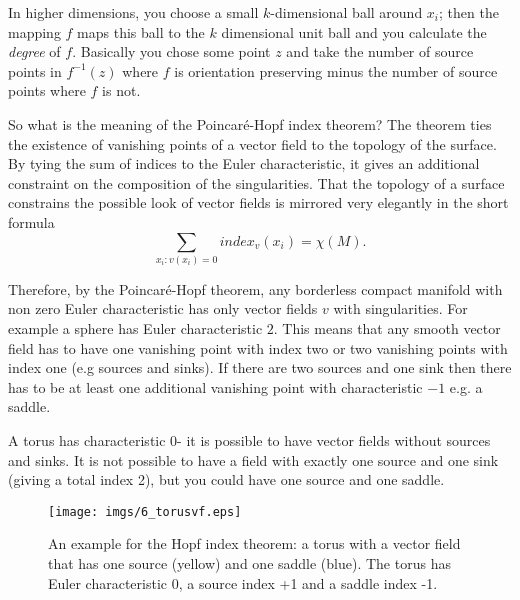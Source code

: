  In higher dimensions, you choose a small $k$-dimensional ball around $x_i$; then the mapping $f$ maps this ball to the $k$ dimensional unit ball and you calculate the \emph{degree} of $f$. Basically you chose some point $z$ and take the number of source points in $f^{-1}(z)$ where $f$ is orientation preserving minus the number of source points where $f$ is not. %


So what is the meaning of the Poincar\'e-Hopf index theorem? 
The theorem ties the existence of vanishing points of a vector field to the topology of the surface. By tying the sum of indices to the Euler characteristic, it gives an additional constraint on the composition of the singularities. That the topology of a surface constrains the possible look of vector fields is mirrored very elegantly in the short formula
\[\sum_{x_i: v(x_i) = 0} index_v(x_i) = \chi(M).\]

Therefore, by the Poincar\'e-Hopf theorem, any borderless compact manifold with non zero Euler characteristic has only vector fields $v$ with singularities. For example a sphere has Euler characteristic $2$. This means that any smooth vector field has to have one vanishing point with index two or two vanishing points with index one (e.g sources and sinks). If there are two sources and one sink then there has to be at least one additional vanishing point with characteristic $-1$ e.g. a saddle. 

A torus has characteristic $0$- it is possible to have vector fields without sources and sinks. It is not possible to have a field with exactly one source and one sink (giving a total index 2), but you could have one source and one saddle. 

\begin{figure}%
\texttt{[image: imgs/6\_torusvf.eps]}%
\caption{An example for the Hopf index theorem: a torus with a vector field that has one source (yellow) and one saddle (blue). The torus has Euler characteristic 0, a source index +1 and a saddle index -1.}%
\label{fig:torusvf}%
\end{figure}


